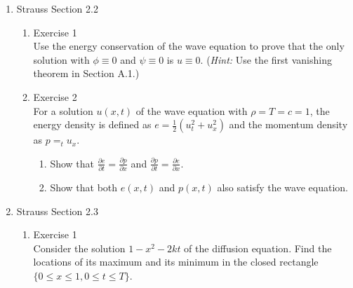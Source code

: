 \documentclass[12pt]{article}%
\begin{document}
\begin{enumerate}
    \pagebreak
    
    \item Strauss Section 2.2 \smallskip
    \begin{enumerate}
        \item Exercise 1 \smallskip \\
        Use the energy conservation of the wave equation to prove that the only solution with $\phi \equiv 0$ and $\psi \equiv 0$ is $u \equiv 0$. (\emph{Hint:} Use the first vanishing theorem in Section A.1.) \smallskip \\

        
        \item Exercise 2 \smallskip \\
        For a solution $u\left(x,t\right)$ of the wave equation with $\rho = T = c = 1$, the energy density is defined as $e = \frac{1}{2}\left(u_t^2 + u_x^2\right)$ and the momentum density as $p = _tu_x$.
        \begin{enumerate}
            \item Show that $\frac{\partial e}{\partial t} = \frac{\partial p}{\partial x}$ and $\frac{\partial p}{\partial t} = \frac{\partial e}{\partial x}$. \smallskip \\

            \item Show that both $e\left(x,t\right)$ and $p\left(x,t\right)$ also satisfy the wave equation. \smallskip \\
            
        \end{enumerate}
    \end{enumerate}
    \item Strauss Section 2.3 \smallskip
    \begin{enumerate}
        \item Exercise 1 \smallskip \\
        Consider the solution $1 - x^2 -2kt$ of the diffusion equation.  Find the locations of its maximum and its minimum in the closed rectangle $\{0 \leq x \leq 1, 0 \leq t \leq T\}$. \smallskip \\

        
    \end{enumerate}
\end{enumerate}
\end{document}
